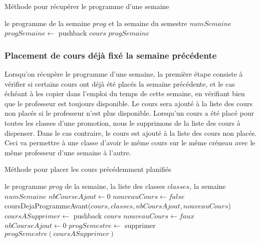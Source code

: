 \begin{algorithm}
\caption{Méthode pour récupérer le programme d'une semaine}
\begin{algorithmic}
\REQUIRE le programme de la semaine $prog$ et la semaine du semestre $numSemaine$
\STATE $progSemaine \leftarrow$ pushback $cours$
\ENDIF
\ENDFOR
\RETURN $progSemaine$
\end{algorithmic}
\end{algorithm}

\subsubsection{Placement de cours déjà fixé la semaine précédente}

Lorsqu'on récupère le programme d'une semaine, la première étape consiste à vérifier si certains cours ont déjà été placés la semaine précédente, et le cas échéant à les copier dans l'emploi du temps de cette semaine, en vérifiant bien que le professeur est toujours disponible. Le cours sera ajouté à la liste des cours non placés si le professeur n'est plus disponible. Lorsqu'un cours a été placé pour toutes les classes d'une promotion, nous le supprimons de la liste des cours à dispenser. Dans le cas contraire, le cours est ajouté à la liste des cours non placés. Ceci va permettre à une classe d'avoir le même cours sur le même créneau avec le même professeur d'une semaine à l'autre.

\begin{algorithm}
\caption{Méthode pour placer les cours précédemment planifiés}
\begin{algorithmic}
\REQUIRE le programme $prog$ de la semaine, la liste des classes $classes$, la semaine $numSemaine$
\STATE $nbCourseAjout \leftarrow 0$
\STATE $nouveauCours \leftarrow false$
\STATE coursDejaProgrammeAvant($cours, classes, nbCoursAjout, nouveauCours$)
\STATE $coursASupprimer \leftarrow$ pushback $cours$
\ELSE 
\STATE $nouveauCours \leftarrow faux$
\ENDIF
\STATE $nbCourseAjout \leftarrow 0$
\ENDFOR
{}
\STATE $progSemestre \leftarrow$ supprimer $progSemestre(coursASupprimer)$
\ENDFOR
\ENDIF
\end{algorithmic}
\end{algorithm}

